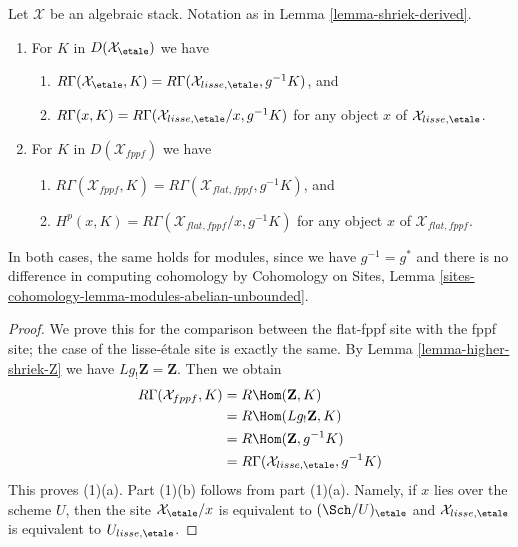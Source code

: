 \begin{lemma}
\label{lemma-lisse-etale-cohomology}
Let $\mathcal{X}$ be an algebraic stack. Notation as in
Lemma \ref{lemma-shriek-derived}.
\begin{enumerate}
\item For $K$ in $D(\mathcal{X}_\etale)$ we have
\begin{enumerate}
\item $R\Gamma(\mathcal{X}_\etale, K) =
R\Gamma(\mathcal{X}_{lisse,\etale}, g^{-1}K)$, and
\item $R\Gamma(x, K) =
R\Gamma(\mathcal{X}_{lisse,\etale}/x, g^{-1}K)$
for any object $x$ of $\mathcal{X}_{lisse,\etale}$.
\end{enumerate}
\item For $K$ in $D(\mathcal{X}_{fppf})$ we have
\begin{enumerate}
\item $R\Gamma(\mathcal{X}_{fppf}, K) =
R\Gamma(\mathcal{X}_{flat,fppf}, g^{-1}K)$, and
\item $H^p(x, K) =
R\Gamma(\mathcal{X}_{flat,fppf}/x, g^{-1}K)$
for any object $x$ of $\mathcal{X}_{flat,fppf}$.
\end{enumerate}
\end{enumerate}
In both cases, the same holds for modules, since we have
$g^{-1} = g^*$ and there is no difference in computing
cohomology by Cohomology on Sites, Lemma
\ref{sites-cohomology-lemma-modules-abelian-unbounded}.
\end{lemma}

\begin{proof}
We prove this for the comparison between the flat-fppf site with the
fppf site; the case of the lisse-\'etale site is exactly the same.
By Lemma \ref{lemma-higher-shriek-Z} we have $Lg_!\mathbf{Z} = \mathbf{Z}$.
Then we obtain
\begin{align*}
R\Gamma(\mathcal{X}_{fppf}, K)
& =
R\Hom(\mathbf{Z}, K) \\
& =
R\Hom(Lg_!\mathbf{Z}, K) \\
& =
R\Hom(\mathbf{Z}, g^{-1}K) \\
& =
R\Gamma(\mathcal{X}_{lisse,\etale}, g^{-1}K)
\end{align*}
This proves (1)(a).
Part (1)(b) follows from part (1)(a). Namely, if $x$ lies over the
scheme $U$, then the site $\mathcal{X}_\etale/x$ is equivalent
to $(\Sch/U)_\etale$ and $\mathcal{X}_{lisse,\etale}$ is equivalent
to $U_{lisse, \etale}$.
\end{proof}










